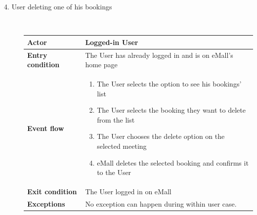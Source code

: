 \documentclass[11pt]{article}
\begin{document}
\begin{description}
    \item [4. User deleting one of his bookings] \hfill \\
    \begin{table}[H]
        \centering
        \setlength{\tabcolsep}{18pt}
        \renewcommand{\arraystretch}{1.4}
        \begin{tabularx}{\textwidth}{|>{\hsize=0.5\hsize}X|>{\hsize=1.5\hsize}X|}
            \hline
            \textbf{Actor} & Logged-in User \\
            \hline
            \textbf{Entry condition} & The User has already logged in and is on eMall's home page \\
            \hline
            \textbf{Event flow} & 
                \begin{minipage}[t]{\hsize}
                \begin{enumerate}[topsep=0pt, leftmargin=*]
                    \item The User selects the option to see his bookings' list
                    \item The User selects the booking they want to delete from the list
                    \item The User chooses the delete option on the selected meeting
                    \item eMall deletes the selected booking and confirms it to the User
                \end{enumerate}
                \end{minipage}
                \vspace{6pt}
            \\
            \hline
            \textbf{Exit condition} & The User logged in on eMall \\
            \hline
            \textbf{Exceptions} & No exception can happen during within user case. \\
            \hline
        \end{tabularx}
    \end{table}
    

\end{description}
\end{document}
